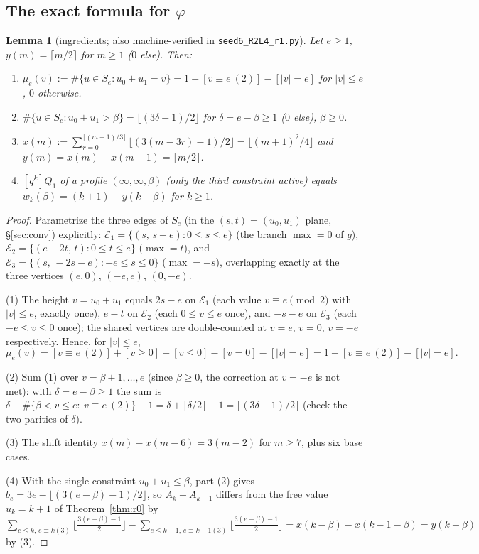 \documentclass[11pt]{article}
\newtheorem{lemma}[theorem]{Lemma}
\theoremstyle{definition}
\theoremstyle{remark}
\begin{document}
\subsection{The exact formula for $\varphi$}

\begin{lemma}[ingredients; also machine-verified in
\texttt{seed6\_R2L4\_r1.py}]\label{lem:ingr}
Let $e\ge1$, $y(m)=\lceil m/2\rceil$ for $m\ge1$ ($0$ else). Then:
\begin{enumerate}
\item $\mu_e(v):=\#\{u\in S_e: u_0+u_1=v\}
=1+[v\equiv e\ (2)]-[|v|=e]$ for $|v|\le e$, $0$ otherwise.
\item $\#\{u\in S_e: u_0+u_1>\beta\}=\lfloor(3\delta-1)/2\rfloor$ for
$\delta=e-\beta\ge1$ ($0$ else), $\beta\ge0$.
\item $x(m):=\sum_{r=0}^{\lfloor(m-1)/3\rfloor}
\lfloor(3(m-3r)-1)/2\rfloor=\lfloor(m+1)^2/4\rfloor$ and
$y(m)=x(m)-x(m-1)=\lceil m/2\rceil$.
\item $[q^k]Q_1$ of a profile $(\infty,\infty,\beta)$ (only the third
constraint active) equals $w_k(\beta)=(k+1)-y(k-\beta)$ for $k\ge1$.
\end{enumerate}
\end{lemma}

\begin{proof}
Parametrize the three edges of $S_e$ (in the $(s,t)=(u_0,u_1)$ plane,
\S\ref{sec:conv}) explicitly:
$\mathcal{E}_1=\{(s,\,s-e):0\le s\le e\}$ (the branch $\max=0$ of $g$),
$\mathcal{E}_2=\{(e-2t,\,t):0\le t\le e\}$ ($\max=t$), and
$\mathcal{E}_3=\{(s,\,-2s-e):-e\le s\le 0\}$ ($\max=-s$), overlapping
exactly at the three vertices $(e,0)$, $(-e,e)$, $(0,-e)$.

(1) The height $v=u_0+u_1$ equals $2s-e$ on $\mathcal{E}_1$ (each value
$v\equiv e\pmod 2$ with $|v|\le e$, exactly once), $e-t$ on $\mathcal{E}_2$
(each $0\le v\le e$ once), and $-s-e$ on $\mathcal{E}_3$ (each
$-e\le v\le0$ once); the shared vertices are double-counted at $v=e$,
$v=0$, $v=-e$ respectively. Hence, for $|v|\le e$,
\[
\mu_e(v)=[v\equiv e\ (2)]+[v\ge0]+[v\le0]-[v{=}0]-[|v|{=}e]
=1+[v\equiv e\ (2)]-[|v|{=}e].
\]

(2) Sum (1) over $v=\beta+1,\dots,e$ (since $\beta\ge0$, the correction at
$v=-e$ is not met): with $\delta=e-\beta\ge1$ the sum is
$\delta+\#\{\beta<v\le e:\ v\equiv e\ (2)\}-1
=\delta+\lceil\delta/2\rceil-1=\lfloor(3\delta-1)/2\rfloor$
(check the two parities of $\delta$).

(3) The shift identity $x(m)-x(m-6)=3(m-2)$ for $m\ge7$, plus six base
cases.

(4) With the single constraint $u_0+u_1\le\beta$, part (2) gives
$b_e=3e-\lfloor(3(e-\beta)-1)/2\rfloor$, so $A_k-A_{k-1}$ differs from the
free value $u_k=k+1$ of Theorem~\ref{thm:r0} by
$\sum_{e\le k,\,e\equiv k(3)}\lfloor\tfrac{3(e-\beta)-1}{2}\rfloor
-\sum_{e\le k-1,\,e\equiv k-1(3)}\lfloor\tfrac{3(e-\beta)-1}{2}\rfloor
=x(k-\beta)-x(k-1-\beta)=y(k-\beta)$ by (3).
\end{proof}
\end{document}
